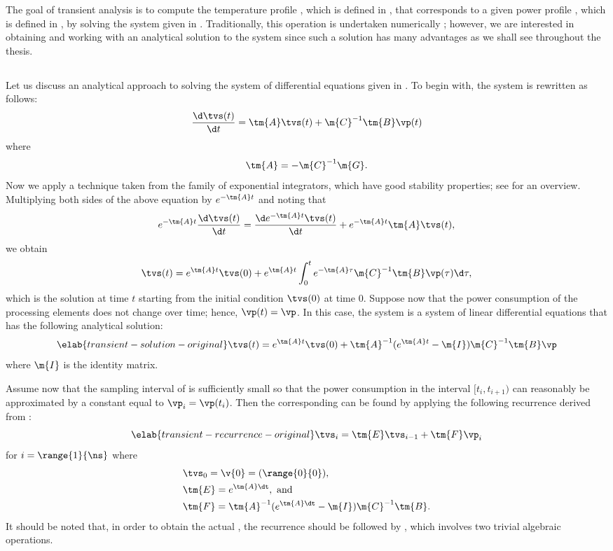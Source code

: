 The goal of transient analysis is to compute the temperature profile \mq, which
is defined in , that corresponds to a given power
profile \mp, which is defined in , by solving the system
given in . Traditionally, this operation is
undertaken numerically \cite{skadron2003}; however, we are interested in
obtaining and working with an analytical solution to the system since such a
solution has many advantages as we shall see throughout the thesis.

\subsection{\priortitle}

Let us discuss an analytical approach to solving the system of differential
equations given in . To begin with, the
system is rewritten as follows:
\[
  \frac{\d \tvs(t)}{\d t} = \tm{A} \tvs(t) + \m{C}^{-1} \tm{B} \vp(t)
\]
where
\[
  \tm{A} = -\m{C}^{-1} \m{G}.
\]
Now we apply a technique taken from the family of exponential integrators, which
have good stability properties; see \cite{hochbruck2010} for an overview.
Multiplying both sides of the above equation by $e^{- \tm{A} t}$ and noting that
\[
  e^{-\tm{A} t} \frac{\d \tvs(t)}{\d t} = \frac{\d e^{-\tm{A} t} \tvs(t)}{\d t} + e^{-\tm{A} t} \tm{A} \tvs(t),
\]
we obtain
\[
  \tvs(t) = e^{\tm{A} t} \tvs(0) + e^{\tm{A} t} \int_0^t e^{-\tm{A} \tau} \m{C}^{-1} \tm{B} \vp(\tau) \d \tau,
\]
which is the solution at time $t$ starting from the initial condition $\tvs(0)$
at time 0. Suppose now that the power consumption of the processing elements
does not change over time; hence, $\vp(t) = \vp$. In this case, the system is a
system of linear differential equations that has the following analytical
solution:
\begin{equation} \elab{transient-solution-original}
  \tvs(t) = e^{\tm{A} t} \tvs(0) + \tm{A}^{-1} (e^{\tm{A} t} - \m{I}) \m{C}^{-1} \tm{B} \vp
\end{equation}
where $\m{I}$ is the identity matrix.

Assume now that the sampling interval \dt of \mp is sufficiently small so that
the power consumption in the interval $[t_i, t_{i + 1})$ can reasonably be
approximated by a constant equal to $\vp_i = \vp(t_i)$. Then the corresponding
\mq can be found by applying the following recurrence derived from
:
\begin{equation} \elab{transient-recurrence-original}
  \tvs_{i} = \tm{E} \tvs_{i - 1} + \tm{F} \vp_i
\end{equation}
for $i = \range{1}{\ns}$ where
\begin{align*}
  & \tvs_0 = \v{0} = (\range{0}{0}), \\
  & \tm{E} = e^{\tm{A} \dt}, \text{ and} \\
  & \tm{F} = \tm{A}^{-1}(e^{\tm{A} \dt} - \m{I})\m{C}^{-1} \tm{B}.
\end{align*}
It should be noted that, in order to obtain the actual \mq, the recurrence
should be followed by , which involves two
trivial algebraic operations.

